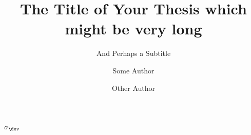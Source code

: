 \documentclass[masters,a4paper]{chalmers-thesis}
\title{The Title of Your Thesis which might be very long}
\subtitle{And Perhaps a Subtitle}
\author{Some Author\and Other Author}
\begin{document}
$\sigma_\dev$

%

%

%

\nocite{*} %
\printbibliography
\end{document}
